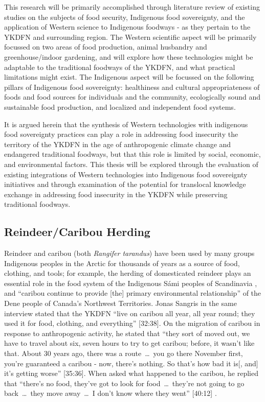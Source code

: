 \documentclass{report}
\begin{document}
\hspace{24pt} This research will be primarily accomplished through literature review of existing studies on the subjects of food security, Indigenous food sovereignty, and the application of Western science to Indigenous foodways - as they pertain to the YKDFN and surrounding region.
The Western scientific aspect will be primarily focussed on two areas of food production, animal husbandry and greenhouse/indoor gardening, and will explore how these technologies might be adaptable to the traditional foodways of the YKDFN, and what practical limitations might exist.
The Indigenous aspect will be focussed on the following pillars of Indigenous food sovereignty: healthiness and cultural appropriateness of foods and food sources for individuals and the community, ecologically sound and sustainable food production, and localized and independent food systems.

\hspace{24pt} It is argued herein that the synthesis of Western technologies with indigenous food sovereignty practices can play a role in addressing food insecurity the territory of the YKDFN in the age of anthropogenic climate change and endangered traditional foodways, but that this role is limited by social, economic, and environmental factors. 
This thesis will be explored through the evaluation of existing integrations of Western technologies into Indigenous food sovereignty initiatives and through examination of the potential for translocal knowledge exchange in addressing food insecurity in the YKDFN while preserving traditional foodways.

\subsection{Reindeer/Caribou Herding}

\hspace{24pt} Reindeer and caribou (both \textit{Rangifer tarandus}) have been used by many groups Indigenous peoples in the Arctic for thousands of years as a source of food, clothing, and tools; for example, the herding of domesticated reindeer plays an essential role in the food system of the Indigenous S\'ami peoples of Scandinavia \parencite{traditionalsiberia}, and ``caribou continue to provide [the] primary environmental relationship'' \parencite[225]{denefoodwaysontologies} of the Dene people of Canada's Northwest Territories. 
Jonas Sangris in the same interview stated that the YKDFN ``live on caribou all year, all year round; they used it for food, clothing, and everything'' [32:38].
On the migration of caribou in response to anthropogenic activity, he stated that ``they sort of moved out, we have to travel about six, seven hours to try to get caribou; before, it wasn't like that. About 30 years ago, there was a route~\ldots~you go there November first, you're guaranteed a caribou - now, there's nothing. So that's how bad it is[, and] it's getting worse'' [35:36]. 
When asked what happened to the caribou, he replied that ``there's no food, they've got to look for food~\ldots~they're not going to go back~\ldots~they move away~\ldots~I don't know where they went'' [40:12] \parencite{jonassangris}.
\end{document}
